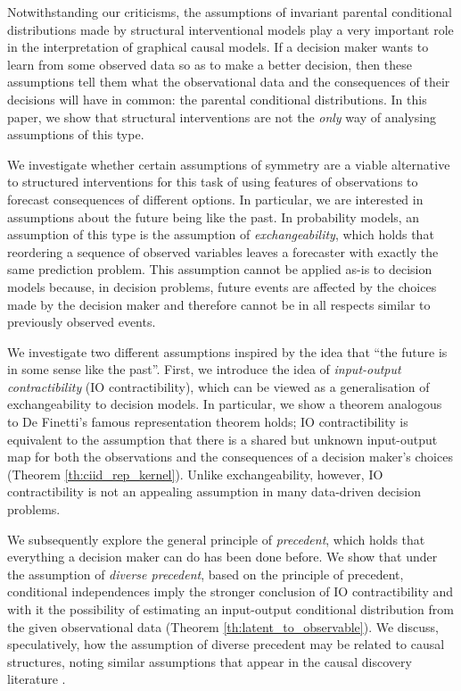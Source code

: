 \documentclass[USenglish,onecolumn]{article}
\begin{document}
Notwithstanding our criticisms, the assumptions of invariant parental conditional distributions made by structural interventional models play a very important role in the interpretation of graphical causal models. If a decision maker wants to learn from some observed data so as to make a better decision, then these assumptions tell them what the observational data and the consequences of their decisions will have in common: the parental conditional distributions. In this paper, we show that structural interventions are not the \emph{only} way of analysing assumptions of this type.

We investigate whether certain assumptions of symmetry are a viable alternative to structured interventions for this task of using features of observations to forecast consequences of different options. In particular, we are interested in assumptions about the future being like the past. In probability models, an assumption of this type is the assumption of \emph{exchangeability}, which holds that reordering a sequence of observed variables leaves a forecaster with exactly the same prediction problem. This assumption cannot be applied as-is to decision models because, in decision problems, future events are affected by the choices made by the decision maker and therefore cannot be in all respects similar to previously observed events.

We investigate two different assumptions inspired by the idea that ``the future is in some sense like the past''. First, we introduce the idea of \emph{input-output contractibility} (IO contractibility), which can be viewed as a generalisation of exchangeability to decision models. In particular, we show a theorem analogous to De Finetti's famous representation \citep{de_finetti_foresight_1992} theorem holds; IO contractibility is equivalent to the assumption that there is a shared but unknown input-output map for both the observations and the consequences of a decision maker's choices (Theorem \ref{th:ciid_rep_kernel}). Unlike exchangeability, however, IO contractibility is not an appealing assumption in many data-driven decision problems.

We subsequently explore the general principle of \emph{precedent}, which holds that everything a decision maker can do has been done before.  We show that under the assumption of \emph{diverse precedent}, based on the principle of precedent, conditional independences imply the stronger conclusion of IO contractibility and with it the possibility of estimating an input-output conditional distribution from the given observational data (Theorem \ref{th:latent_to_observable}). We discuss, speculatively, how the assumption of diverse precedent may be related to causal structures, noting similar assumptions that appear in the causal discovery literature \citep{meek_strong_1995, janzingCausalVersionsMaximum2021}.
\end{document}
